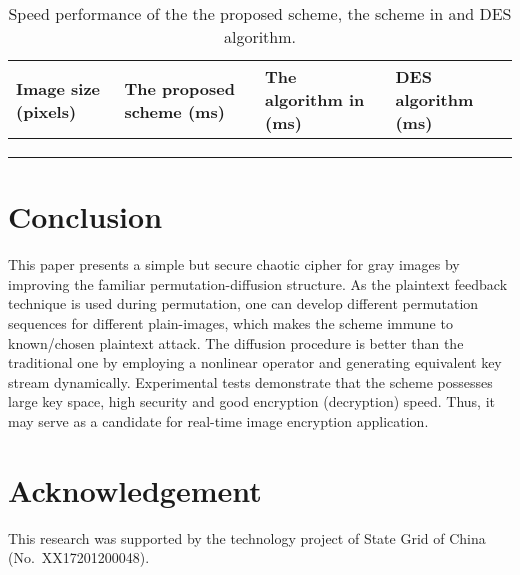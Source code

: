 \documentclass[3p,preprint,11pt]{elsarticle}
\begin{document}
\begin{table}[!htb]
\centering
\caption{Speed performance of the the proposed scheme, the scheme in \cite{Chen:3DChaoticCipher:CSF04} and
DES algorithm.}
\begin{tabular}{ p{2cm}  p{3.6cm}  p{3cm}  p{3.4cm} }
\hline  {Image size (pixels)} &{The proposed scheme (ms)}    &{The  algorithm in \cite{Chen:3DChaoticCipher:CSF04} (ms)}
                                                            &{DES algorithm (ms)}\\
\hline           &      &            &                 \\
\hline           &      &           &                 \\
\hline         &     &          &                \\
\hline
\end{tabular}
\label{tab:runspeed}
\end{table}


\section{Conclusion}
This paper presents a simple but secure chaotic cipher for gray images by
improving the familiar permutation-diffusion structure.
As the plaintext feedback technique is used during permutation, one can develop different permutation
sequences for different plain-images, which makes the scheme immune to known/chosen plaintext attack.
The diffusion procedure is better than the traditional one by employing a nonlinear
operator  and generating equivalent key stream dynamically.
Experimental tests demonstrate that the scheme possesses large key space, high security
and good encryption (decryption) speed. Thus, it may serve as a candidate for real-time image encryption application.

\section*{Acknowledgement}
This research was supported by the technology project of State Grid of China (No.~XX17201200048).



\end{document}
